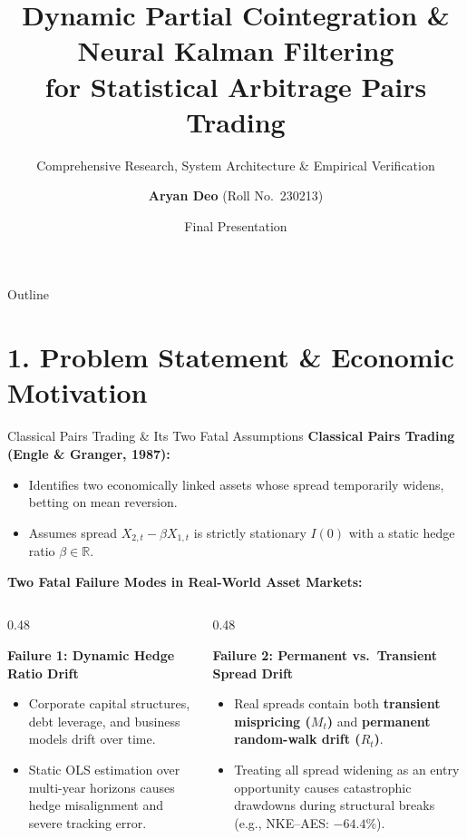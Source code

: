 \documentclass[10pt, aspectratio=169]{beamer}
\title[Dynamic-PCI \& Neural Kalman Filtering]{%
  Dynamic Partial Cointegration \& Neural Kalman Filtering\\[3pt]
  \large for Statistical Arbitrage Pairs Trading}
\subtitle{Comprehensive Research, System Architecture \& Empirical Verification}
\author{\textbf{Aryan Deo} (Roll No.\ 230213)}
\institute{Undergraduate Project (UGP) --- MTH497\\[2pt]
Department of Mathematics \& Statistics\\
Indian Institute of Technology Kanpur}
\date{Final Presentation}
\newcommand{\R}{\mathbb{R}}
\begin{document}
\begin{frame}
  \titlepage
\end{frame}

\begin{frame}{Outline}
  \tableofcontents
\end{frame}

\section{1. Problem Statement \& Economic Motivation}

\begin{frame}{Classical Pairs Trading \& Its Two Fatal Assumptions}
  \textbf{Classical Pairs Trading (Engle \& Granger, 1987):}
  \begin{itemize}
    \item Identifies two economically linked assets whose spread temporarily widens, betting on mean reversion.
    \item Assumes spread $X_{2,t} - \beta X_{1,t}$ is strictly stationary $I(0)$ with a static hedge ratio $\beta \in \R$.
  \end{itemize}
  \vspace{6pt}
  \textbf{Two Fatal Failure Modes in Real-World Asset Markets:}
  \begin{columns}[T]
    \begin{column}{0.48\textwidth}
      \begin{block}{\textbf{Failure 1: Dynamic Hedge Ratio Drift}}
        \begin{itemize}
          \item Corporate capital structures, debt leverage, and business models drift over time.
          \item Static OLS estimation over multi-year horizons causes hedge misalignment and severe tracking error.
        \end{itemize}
      \end{block}
    \end{column}
    \begin{column}{0.48\textwidth}
      \begin{block}{\textbf{Failure 2: Permanent vs.\ Transient Spread Drift}}
        \begin{itemize}
          \item Real spreads contain both \textcolor{posgreen}{\textbf{transient mispricing ($M_t$)}} and \textcolor{negred}{\textbf{permanent random-walk drift ($R_t$)}}.
          \item Treating all spread widening as an entry opportunity causes catastrophic drawdowns during structural breaks (e.g., NKE--AES: $-64.4\%$).
        \end{itemize}
      \end{block}
    \end{column}
  \end{columns}
\end{frame}
\end{document}
